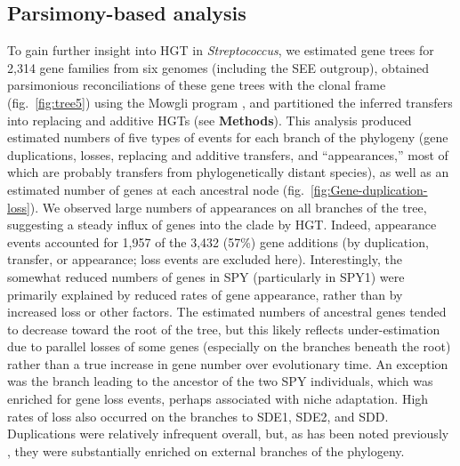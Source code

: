 \documentclass[12pt]{article}
\begin{document}
\subsection*{Parsimony-based analysis}

To gain further insight into HGT in {\em Streptococcus}, we estimated gene
trees for 2,314 gene families from six genomes (including the SEE outgroup),
obtained parsimonious reconciliations of these gene trees with the clonal
frame (fig.\ \ref{fig:tree5}) using the Mowgli program \citep{Doyon2011},
and partitioned the inferred transfers into replacing and additive HGTs
(see \textbf{Methods}).  This analysis produced estimated numbers of five
types of events for each branch of the phylogeny (gene duplications,
losses, replacing and additive transfers, and ``appearances,'' most of
which are probably transfers from phylogenetically distant species), as
well as an estimated number of genes at each ancestral node 
(fig.\ \ref{fig:Gene-duplication-loss}).  We observed large numbers of
appearances on all branches of the tree, suggesting a steady influx of
genes into the clade by HGT.  Indeed, appearance events accounted for 1,957
of the 3,432 (57\%) gene additions (by duplication, transfer, or appearance;
loss events are excluded here).  Interestingly, the somewhat reduced
numbers of genes in SPY (particularly in SPY1) were primarily explained by
reduced rates of gene appearance, rather than by increased loss or other
factors.  The estimated numbers of ancestral genes tended to decrease
toward the root of the tree, but this likely reflects under-estimation due
to parallel losses of some genes (especially on the branches beneath the
root) rather than a true increase in gene number over evolutionary time.
An exception was the branch leading to the ancestor of the two SPY
individuals, which was enriched for gene loss events, perhaps associated
with niche adaptation.  High rates of loss also occurred on the branches to
SDE1, SDE2, and SDD.  Duplications were relatively infrequent overall, but,
as has been noted previously \citep{Marri2006}, they were substantially
enriched on external branches of the phylogeny.

\end{document}
